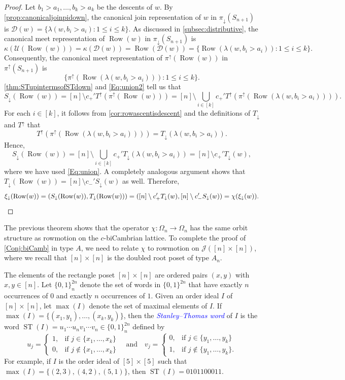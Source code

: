 \documentclass[11pt]{amsart}
\newcommand{\ST}{\operatorname{ST}}
\theoremstyle{definition}
\DeclareMathOperator{\row}{Row}
\newcommand{\dfn}[1]{\textcolor{blue}{\emph{#1}}}
\begin{document}
\begin{proof}
    Let $b_1>a_1, \ldots , b_k>a_k$ be the descents of $w$. By \cref{prop:canonicaljoinpidown}, the canonical join representation of $w$ in $\pi_\downarrow(S_{n+1})$ is $\mathcal{D}(w)=\{\lambda(w,b_i>a_i):1\leq i\leq k\}$. As discussed in \cref{subsec:distributive}, the canonical meet representation of $\row(w)$ in $\pi_\downarrow(S_{n+1})$ is \[\kappa(\mathcal{U}(\row(w)))=\kappa(\mathcal{D}(w))=\row(\mathcal{D}(w))=\{\row(\lambda(w,b_i>a_i)):1\leq i\leq k\}.\] Consequently, the canonical meet representation of $\pi^\uparrow(\row(w))$ in $\pi^\uparrow(S_{n+1})$ is \[\{\pi^\uparrow(\row(\lambda(w,b_i>a_i))):1\leq i\leq k\}.\] \cref{thm:STupintermsofSTdown} and \eqref{Eq:union2} tell us that
\[
        S_\downarrow(\row(w))= [n]\setminus c_+'T^\uparrow(\pi^\uparrow(\row(w)))= [n]\setminus \bigcup_{i\in [k]} c_+'T^\uparrow(\pi^\uparrow(\row(\lambda(w, b_i>a_i)))).\]  For each $i\in[k]$, it follows from \cref{cor:rowascentisdescent} and the definitions of $T_\downarrow$ and $T^\uparrow$ that \[T^\uparrow(\pi^\uparrow(\row(\lambda(w,b_i>a_i))))=T_\downarrow(\lambda(w, b_i>a_i)).\] Hence, \[S_\downarrow(\row(w))=[n]\setminus\bigcup_{i\in[k]}c_+'T_\downarrow(\lambda(w,b_i>a_i))= [n]\setminus c_+'T_\downarrow(w),\]
where we have used \eqref{Eq:union}. A completely analogous argument shows that $T_\downarrow(\row(w))=[n]\setminus c_-'S_\downarrow(w)$ as well. Therefore, \[\xi_\downarrow(\row(w))=(S_\downarrow(\row(w)),T_\downarrow(\row(w)))=([n]\setminus c_+'T_\downarrow(w),[n]\setminus c_-'S_\downarrow(w))=\chi(\xi_\downarrow(w)). \qedhere\]
\end{proof}

The previous theorem shows that the operator $\chi\colon\Omega_n\to\Omega_n$ has the same orbit structure as rowmotion on the $c$-biCambrian lattice. To complete the proof of \cref{Conj:biCamb} in type $A$, we need to relate $\chi$ to rowmotion on $\mathcal J([n]\times[n])$, where we recall that $[n]\times[n]$ is the doubled root poset of type $A_n$. 

The elements of the rectangle poset $[n]\times [n]$ are ordered pairs $(x,y)$ with $x,y\in[n]$. Let $\{0,1\}^{2n}_n$ denote the set of words in $\{0,1\}^{2n}$ that have exactly $n$ occurrences of $0$ and exactly $n$ occurrences of $1$. Given an order ideal $I$ of $[n]\times [n]$, let $\max(I)$ denote the set of maximal elements of $I$. If $\max(I)=\{(x_1,y_1),\ldots,(x_k,y_k)\}$, then the \dfn{Stanley--Thomas word} of $I$ is the word $\ST(I)=u_1\cdots u_n v_{1}\cdots v_n\in\{0,1\}_n^{2n}$ defined by 
\[u_j=\begin{cases} 1, & \mbox{if $j\in\{x_1,\ldots,x_k\}$} \\ 0, & \mbox{if $j\not\in\{x_1,\ldots,x_k\}$}\end{cases}\quad\text{and}\quad v_j=\begin{cases} 0, & \mbox{if $j\in\{y_1,\ldots,y_k\}$} \\ 1, & \mbox{if $j\not\in\{y_1,\ldots,y_k\}$.}\end{cases}\] For example, if $I$ is the order ideal of $[5]\times [5]$ such that $\max(I)=\{(2,3),(4,2),(5,1)\}$, then $\ST(I)=0101100011$.
\end{document}
